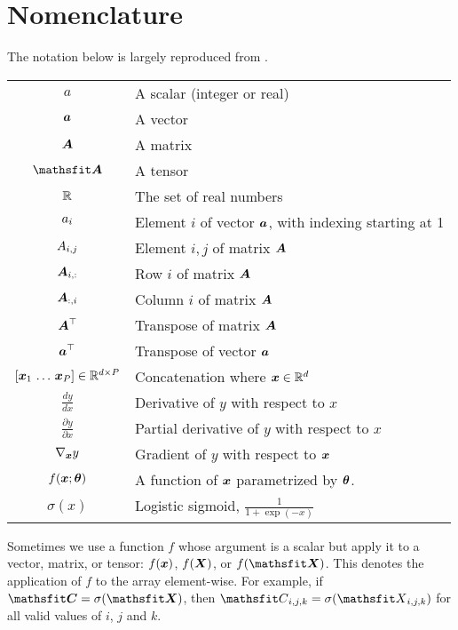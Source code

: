 \chapter{Nomenclature}
\label{section:Nomenclature}
The notation below is largely reproduced from \citet{Goodfellow-et-al-2016}.


\vspace{\notationgap}
\def\arraystretch{1.5}
\begin{tabular}{cp{3.25in}}
	$\displaystyle a$ & A scalar (integer or real)\\
	$\displaystyle {\bm{a}}$ & A vector\\
	$\displaystyle {\bm{A}}$ & A matrix\\
	$\displaystyle \tA$ & A tensor\\
	$\displaystyle \mathbb{R}$ & The set of real numbers \\
	$\displaystyle {a}_i$ & Element $i$ of vector ${\bm{a}}$, with indexing starting at 1 \\
	$\displaystyle {A}_{i,j}$ & Element $i, j$ of matrix ${\bm{A}}$ \\
	$\displaystyle {\bm{A}}_{i, :}$ & Row $i$ of matrix ${\bm{A}}$ \\
	$\displaystyle {\bm{A}}_{:, i}$ & Column $i$ of matrix ${\bm{A}}$ \\
	$\displaystyle {\bm{A}}^\top$ & Transpose of matrix ${\bm{A}}$ \\
	$\displaystyle {\bm{a}}^\top$ & Transpose of vector ${\bm{a}}$ \\
	$[{\bm{x}}_1 \, \ldots \, {\bm{x}}_P] \in \mathbb{R}^{d \times P}$ & Concatenation where ${\bm{x}} \in \mathbb{R}^d$ \\
	$\frac{d y} {d x}$ & Derivative of $y$ with respect to $x$\\ [2ex]
	$\displaystyle \frac{\partial y} {\partial x} $ & Partial derivative of $y$ with respect to $x$ \\
	$\displaystyle \nabla_{\bm{x}} y $ & Gradient of $y$ with respect to ${\bm{x}}$ \\
	$\displaystyle f({\bm{x}} ; {\bm{\theta}}) $ & A function of ${\bm{x}}$ parametrized by ${\bm{\theta}}$. \\
	$\displaystyle \sigma(x)$ & Logistic sigmoid, $\displaystyle \frac{1} {1 + \exp(-x)}$ \\
\end{tabular}

Sometimes we use a function $f$ whose argument is a scalar but apply
it to a vector, matrix, or tensor: $f({\bm{x}})$, $f({\bm{X}})$, or $f(\tX)$.
This denotes the application of $f$ to the
array element-wise. For example, if $\tC = \sigma(\tX)$, then $\etC_{i,j,k} = \sigma(\etX_{i,j,k})$
for all valid values of $i$, $j$ and $k$.